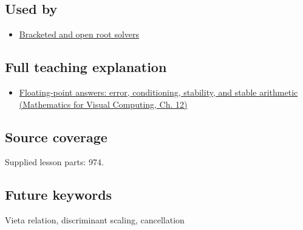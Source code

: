\subsection{Used by}\label{appendix-b9afba7f63e5-used-by}

\begin{itemize}
\tightlist
\item
  \hyperref[appendix-f63eb850796d]{Bracketed and open root solvers}
\end{itemize}

\subsection{Full teaching explanation}\label{appendix-b9afba7f63e5-full-teaching-explanation}

\begin{itemize}
\tightlist
\item
  \href{../02-Mathematics-for-Visual-Computing/main.pdf\#nameddest=02-foundations-ii-ch028-floating-point-answers-error-conditioning-stability-and-stable-arithmetic}{Floating-point answers: error, conditioning, stability, and stable arithmetic (Mathematics for Visual Computing, Ch. 12)}
\end{itemize}

\subsection{Source coverage}\label{appendix-b9afba7f63e5-source-coverage}

Supplied lesson parts: 974.

\subsection{Future keywords}\label{appendix-b9afba7f63e5-future-keywords}

Vieta relation, discriminant scaling, cancellation
